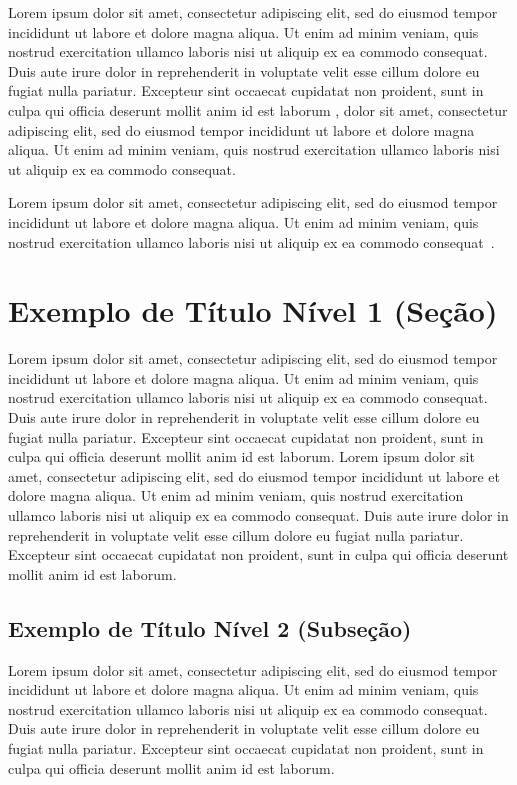 \documentclass[spanish]{sbc2025}%
\begin{document}
Lorem ipsum dolor sit amet, consectetur adipiscing elit, sed do eiusmod tempor incididunt ut labore et dolore magna aliqua. Ut enim ad minim veniam, quis nostrud exercitation ullamco laboris nisi ut aliquip ex ea commodo consequat. Duis aute irure dolor in reprehenderit in voluptate velit esse cillum dolore eu fugiat nulla pariatur. Excepteur sint occaecat cupidatat non proident, sunt in culpa qui officia deserunt mollit anim id est laborum \citep{ref3}, dolor sit amet, consectetur adipiscing elit, sed do eiusmod tempor incididunt ut labore et dolore magna aliqua. Ut enim ad minim veniam, quis nostrud exercitation ullamco laboris nisi ut aliquip ex ea commodo consequat.

Lorem ipsum dolor sit amet, consectetur adipiscing elit, sed do eiusmod tempor incididunt ut labore et dolore magna aliqua. Ut enim ad minim veniam, quis nostrud exercitation ullamco laboris nisi ut aliquip ex ea commodo consequat~\citep{ref4}.


 
\section{Exemplo de Título Nível 1 (Seção)}
Lorem ipsum dolor sit amet, consectetur adipiscing elit, sed do eiusmod tempor incididunt ut labore et dolore magna aliqua. Ut enim ad minim veniam, quis nostrud exercitation ullamco laboris nisi ut aliquip ex ea commodo consequat. Duis aute irure dolor in reprehenderit in voluptate velit esse cillum dolore eu fugiat nulla pariatur. Excepteur sint occaecat cupidatat non proident, sunt in culpa qui officia deserunt mollit anim id est laborum. Lorem ipsum dolor sit amet, consectetur adipiscing elit, sed do eiusmod tempor incididunt ut labore et dolore magna aliqua. Ut enim ad minim veniam, quis nostrud exercitation ullamco laboris nisi ut aliquip ex ea commodo consequat. Duis aute irure dolor in reprehenderit in voluptate velit esse cillum dolore eu fugiat nulla pariatur. Excepteur sint occaecat cupidatat non proident, sunt in culpa qui officia deserunt mollit anim id est laborum.

\subsection{Exemplo de Título Nível 2 (Subseção)}

Lorem ipsum dolor sit amet, consectetur adipiscing elit, sed do eiusmod tempor incididunt ut labore et dolore magna aliqua. Ut enim ad minim veniam, quis nostrud exercitation ullamco laboris nisi ut aliquip ex ea commodo consequat. Duis aute irure dolor in reprehenderit in voluptate velit esse cillum dolore eu fugiat nulla pariatur. Excepteur sint occaecat cupidatat non proident, sunt in culpa qui officia deserunt mollit anim id est laborum.
\end{document}
